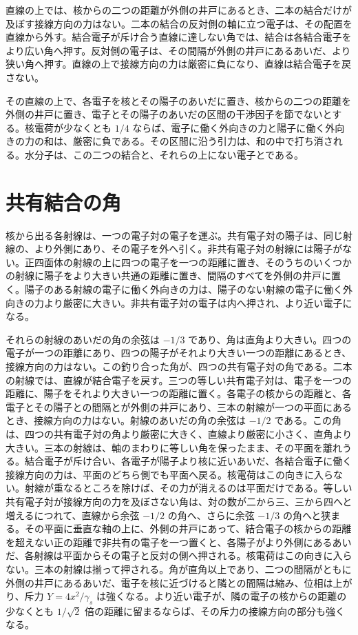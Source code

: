 \documentclass[a4paper]{article}
\begin{document}
直線の上では、核からの二つの距離が外側の井戸にあるとき、二本の結合だけが及ぼす接線方向の力はない。二本の結合の反対側の軸に立つ電子は、その配置を直線から外す。結合電子が斥け合う直線に達しない角では、結合は各結合電子をより広い角へ押す。反対側の電子は、その間隔が外側の井戸にあるあいだ、より狭い角へ押す。直線の上で接線方向の力は厳密に負になり、直線は結合電子を戻さない。

その直線の上で、各電子を核とその陽子のあいだに置き、核からの二つの距離を外側の井戸に置き、電子とその陽子のあいだの区間の干渉因子を節でないとする。核電荷が少なくとも \(1/4\) ならば、電子に働く外向きの力と陽子に働く外向きの力の和は、厳密に負である。その区間に沿う引力は、和の中で打ち消される。水分子は、この二つの結合と、それらの上にない電子とである。

\section{共有結合の角}
\label{sec:angle}

核から出る各射線は、一つの電子対の電子を運ぶ。共有電子対の陽子は、同じ射線の、より外側にあり、その電子を外へ引く。非共有電子対の射線には陽子がない。正四面体の射線の上に四つの電子を一つの距離に置き、そのうちのいくつかの射線に陽子をより大きい共通の距離に置き、間隔のすべてを外側の井戸に置く。陽子のある射線の電子に働く外向きの力は、陽子のない射線の電子に働く外向きの力より厳密に大きい。非共有電子対の電子は内へ押され、より近い電子になる。

それらの射線のあいだの角の余弦は \(-1/3\) であり、角は直角より大きい。四つの電子が一つの距離にあり、四つの陽子がそれより大きい一つの距離にあるとき、接線方向の力はない。この釣り合った角が、四つの共有電子対の角である。二本の射線では、直線が結合電子を戻す。三つの等しい共有電子対は、電子を一つの距離に、陽子をそれより大きい一つの距離に置く。各電子の核からの距離と、各電子とその陽子との間隔とが外側の井戸にあり、三本の射線が一つの平面にあるとき、接線方向の力はない。射線のあいだの角の余弦は \(-1/2\) である。この角は、四つの共有電子対の角より厳密に大きく、直線より厳密に小さく、直角より大きい。三本の射線は、軸のまわりに等しい角を保ったまま、その平面を離れうる。結合電子が斥け合い、各電子が陽子より核に近いあいだ、各結合電子に働く接線方向の力は、平面のどちら側でも平面へ戻る。核電荷はこの向きに入らない。射線が重なるところを除けば、その力が消えるのは平面だけである。等しい共有電子対が接線方向の力を及ぼさない角は、対の数が二から三、三から四へと増えるにつれて、直線から余弦 \(-1/2\) の角へ、さらに余弦 \(-1/3\) の角へと狭まる。その平面に垂直な軸の上に、外側の井戸にあって、結合電子の核からの距離を超えない正の距離で非共有の電子を一つ置くと、各陽子がより外側にあるあいだ、各射線は平面からその電子と反対の側へ押される。核電荷はこの向きに入らない。三本の射線は揃って押される。角が直角以上であり、二つの間隔がともに外側の井戸にあるあいだ、電子を核に近づけると隣との間隔は縮み、位相は上がり、斥力 \(Y=4x^{2}/\gamma_s\) は強くなる。より近い電子が、隣の電子の核からの距離の少なくとも \(1/\sqrt{2}\) 倍の距離に留まるならば、その斥力の接線方向の部分も強くなる。
\end{document}
